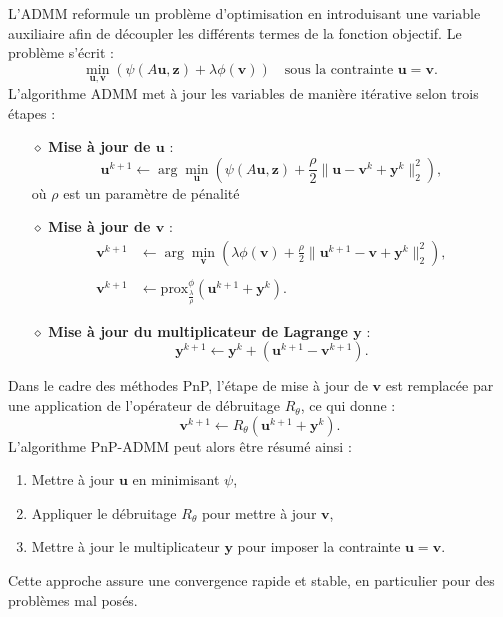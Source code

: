 \documentclass[a4paper, 12pt]{report} %
\begin{document}
L’ADMM reformule un problème d’optimisation en introduisant une variable auxiliaire afin de découpler les différents termes de la fonction objectif. Le problème s’écrit :
\[
\min_{\mathbf{u}, \mathbf{v}} \left( \psi(A\mathbf{u}, \mathbf{z}) + \lambda \phi(\mathbf{v}) \right) \quad \text{sous la contrainte } \mathbf{u} = \mathbf{v}.
\]
L’algorithme ADMM met à jour les variables de manière itérative selon trois étapes :
\begin{itemize}
    \item [$\diamond$] \textbf{Mise à jour de \( \mathbf{u} \)} :
    \[
    \mathbf{u}^{k+1} \leftarrow \arg\min_{\mathbf{u}} \left( \psi(A\mathbf{u}, \mathbf{z}) + \frac{\rho}{2} \| \mathbf{u} - \mathbf{v}^k + \mathbf{y}^k \|_2^2 \right),
    \]
     où $\rho $ est un paramètre de pénalité
    \item [$\diamond$] \textbf{Mise à jour de \( \mathbf{v} \)} :
     \begin{align*}
    \mathbf{v}^{k+1} &\leftarrow \arg\min_{\mathbf{v}} \left( \lambda \phi(\mathbf{v}) + \frac{\rho}{2} \| \mathbf{u}^{k+1} - \mathbf{v} + \mathbf{y}^k \|_2^2 \right), \\\\
    \mathbf{v}^{k+1} &\leftarrow  \text{prox}_{\frac{\lambda}{\rho}}^{\phi}( \mathbf{u}^{k+1} + \mathbf{y}^k). 
     \end{align*}
    \item [$\diamond$] \textbf{Mise à jour du multiplicateur de Lagrange \( \mathbf{y} \)} :
    \[
    \mathbf{y}^{k+1} \leftarrow \mathbf{y}^k + (\mathbf{u}^{k+1} - \mathbf{v}^{k+1}).
    \]
\end{itemize}
Dans le cadre des méthodes PnP, l’étape de mise à jour de \( \mathbf{v} \) est remplacée par une application de l’opérateur de débruitage \( R_\theta \), ce qui donne :
\[
\mathbf{v}^{k+1} \leftarrow R_\theta(\mathbf{u}^{k+1} + \mathbf{y}^k).
\]
L’algorithme PnP-ADMM peut alors être résumé ainsi :
\begin{enumerate}
    \item Mettre à jour \( \mathbf{u} \) en minimisant \( \psi \),
    \item Appliquer le débruitage \( R_\theta \) pour mettre à jour \( \mathbf{v} \),
    \item Mettre à jour le multiplicateur \( \mathbf{y} \) pour imposer la contrainte \( \mathbf{u} = \mathbf{v} \).
\end{enumerate}

Cette approche assure une convergence rapide et stable, en particulier pour des problèmes mal posés.
\end{document}
